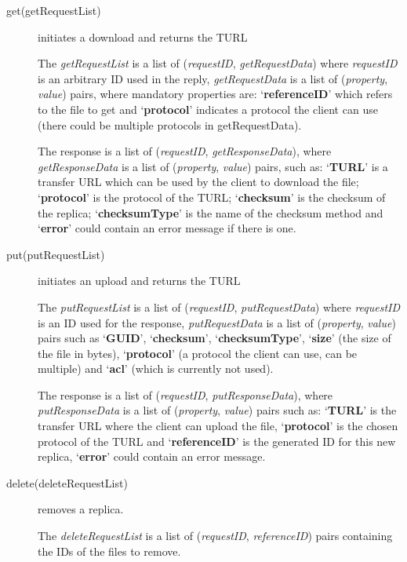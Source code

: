 \documentclass{book}
\begin{document}
\begin{description}
    
    \item[get(getRequestList)] initiates a download and returns the TURL
    
    The \emph{getRequestList} is a list of (\emph{requestID}, \emph{getRequestData}) where \emph{requestID} is an arbitrary ID used in the reply, \emph{getRequestData} is a list of (\emph{property}, \emph{value}) pairs, where mandatory properties are: `\textbf{referenceID}' which refers to the file to get and `\textbf{protocol}' indicates a protocol the client can use (there could be multiple protocols in getRequestData).
    
    The response is a list of (\emph{requestID}, \emph{getResponseData}), where \emph{getResponseData} is a list of (\emph{property}, \emph{value}) pairs, such as: `\textbf{TURL}' is a transfer URL which can be used by the client to download the file; `\textbf{protocol}' is the protocol of the TURL; `\textbf{checksum}' is the checksum of the replica; `\textbf{checksumType}' is the name of the checksum method and `\textbf{error}' could contain an error message if there is one.
     
    \item[put(putRequestList)] initiates an upload and returns the TURL
        
    The \emph{putRequestList} is a list of (\emph{requestID}, \emph{putRequestData}) where \emph{requestID} is an ID used for the response,     \emph{putRequestData} is a list of (\emph{property}, \emph{value}) pairs such as `\textbf{GUID}', `\textbf{checksum}', `\textbf{checksumType}', `\textbf{size}' (the size of the file in bytes), `\textbf{protocol}' (a protocol the client can use, can be multiple) and `\textbf{acl}' (which is currently not used).
    
    The response is a list of (\emph{requestID}, \emph{putResponseData}), where \emph{putResponseData} is a list of (\emph{property}, \emph{value}) pairs such as: `\textbf{TURL}' is the transfer URL where the client can upload the file, `\textbf{protocol}' is the chosen protocol of the TURL and `\textbf{referenceID}' is the generated ID for this new replica, `\textbf{error}' could contain an error message.
    
    \item[delete(deleteRequestList)] removes a replica.
    
    The \emph{deleteRequestList} is a list of (\emph{requestID}, \emph{referenceID}) pairs containing the IDs of the files to remove.
    

\end{description}
\end{document}
